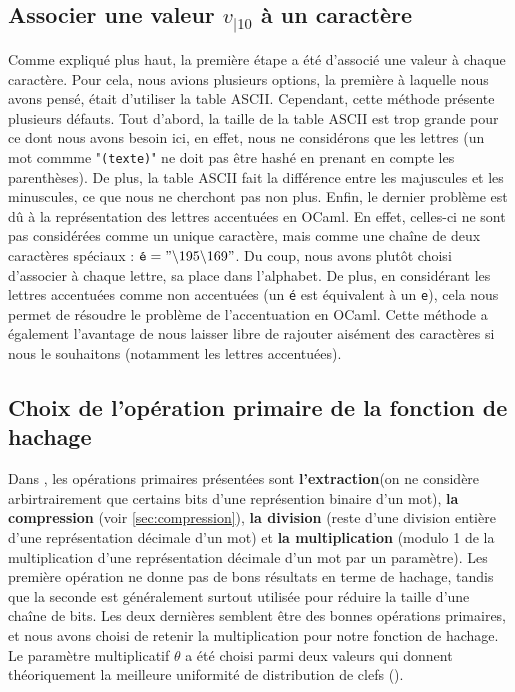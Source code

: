 \documentclass[final,twoside,article,10pt]{scrartcl}
\begin{document}
    \subsection{Associer une valeur $v_{|10}$ à un caractère}
    Comme expliqué plus haut, la première étape a été d'associé une valeur à chaque caractère. Pour cela, nous avions plusieurs options, la première à laquelle nous avons pensé, était d'utiliser la table ASCII. Cependant, cette méthode présente plusieurs défauts. Tout d'abord, la taille de la table ASCII est trop grande pour ce dont nous avons besoin ici, en effet, nous ne considérons que les lettres (un mot commme "\texttt{(texte)}" ne doit pas être hashé en prenant en compte les parenthèses). De plus, la table ASCII fait la différence entre les majuscules et les minuscules, ce que nous ne cherchont pas non plus. Enfin, le dernier problème est dû à la représentation des lettres accentuées en OCaml. En effet, celles-ci ne sont pas considérées comme un unique caractère, mais comme une chaîne de deux caractères spéciaux : $\texttt{é} = "\backslash 195\backslash 169"$. 
    Du coup, nous avons plutôt choisi d'associer à chaque lettre, sa place dans l'alphabet. De plus, en considérant les lettres accentuées comme non accentuées (un \texttt{é} est équivalent à un \texttt{e}), cela nous permet de résoudre le problème de l'accentuation en OCaml. Cette méthode a également l'avantage de nous laisser libre de rajouter aisément des caractères si nous le souhaitons (notamment les lettres accentuées).

    \subsection{Choix de l'opération primaire de la fonction de hachage}
    Dans \cite{soria}, les opérations primaires présentées sont \textbf{l'extraction}(on ne considère arbirtrairement que certains bits d'une représention binaire d'un mot), \textbf{la compression} (voir \ref{sec:compression}), \textbf{la division} (reste d'une division entière d'une représentation décimale d'un mot) et \textbf{la multiplication} (modulo 1 de la multiplication d'une représentation décimale d'un mot par un paramètre).
    Les première opération ne donne pas de bons résultats en terme de hachage, tandis que la seconde est généralement surtout utilisée pour réduire la taille d'une chaîne de bits. Les deux dernières semblent être des bonnes opérations primaires, et nous avons choisi de retenir la multiplication pour notre fonction de hachage. Le paramètre multiplicatif $\theta$ a été choisi parmi deux valeurs qui donnent théoriquement la meilleure uniformité de distribution de clefs (\cite{soria}).
\end{document}
